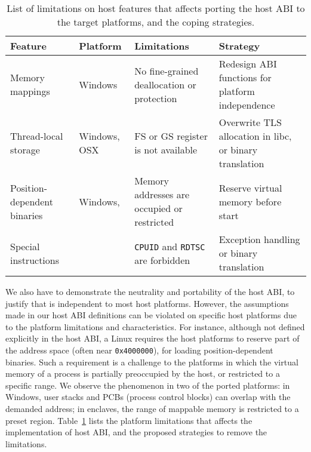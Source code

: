 \begin{table}[t]
\footnotesize
\centering
\begin{tabular}{|p{1.2in}|>{\raggedright\arraybackslash}p{0.8in}|>{\raggedright\arraybackslash}p{1.6in}|>{\raggedright\arraybackslash}p{2.2in}|}
\hline
{\bf Feature} & {\bf Platform} & {\bf Limitations} & {\bf Strategy} \\
\hline
Memory mappings & Windows & No fine-grained deallocation or protection & Redesign ABI functions for platform independence \\
\hline
Thread-local storage & Windows, OSX & FS or GS register is not available & Overwrite TLS allocation in libc, or binary translation \\
\hline
Position-dependent binaries & Windows, \sgx{} & Memory addresses are occupied or restricted & Reserve virtual memory before \picoprocs{} start \\
\hline
Special instructions & \sgx{} & {\tt CPUID} and {\tt RDTSC} are forbidden & Exception handling or binary translation \\
\hline
\end{tabular}
\caption[List of platform limitations affecting host ABI porting]
{List of limitations on host features that affects porting the host ABI to the target platforms,
and the coping strategies.}
\label{tab:future:abi-limit}
\end{table}

We also have to demonstrate the neutrality and portability of the host ABI,
to justify that \graphene{} is independent to most host platforms.
However, the assumptions made in our host ABI definitions
can be violated on specific host platforms
due to the platform limitations and characteristics.
For instance, although not defined explicitly in the host ABI,
a Linux \picoprocs{} requires the host platforms
to reserve part of the address space (often near {\tt 0x4000000}), for loading position-dependent binaries.
Such a requirement is a challenge to the platforms
in which the virtual memory of a process is partially preoccupied by the host,
or restricted to a specific range.
We observe the phenomenon in two of the ported platforms:
in Windows, user stacks and PCBs (process control blocks) can overlap with the demanded address;
in \sgx{} enclaves, the range of mappable memory is
restricted to a preset region.
Table~\ref{tab:future:abi-limit}
lists the platform limitations that affects the implementation of host ABI,
and the proposed strategies to remove the limitations.


